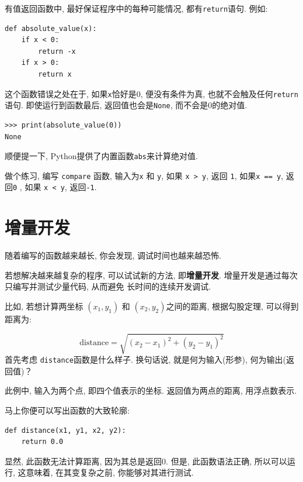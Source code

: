 \documentclass[10pt]{book}
\begin{document}
有值返回函数中, 最好保证程序中的每种可能情况, 都有{\tt return}语句. 例如:

\begin{verbatim}
def absolute_value(x):
    if x < 0:
        return -x
    if x > 0:
        return x
\end{verbatim}
%

这个函数错误之处在于, 如果{\tt x}恰好是0,
便没有条件为真, 也就不会触及任何{\tt return}语句. 
即使运行到函数最后, 返回值也会是{\tt None}, 而不会是0的绝对值. 

\begin{verbatim}
>>> print(absolute_value(0))
None
\end{verbatim}
%
顺便提一下, Python提供了内置函数{\tt abs}来计算绝对值. 

做个练习, 编写 {\tt compare} 函数, 输入为{\tt x} 和 {\tt y}, 
如果 {\tt x > y},  返回 {\tt 1}, 
如果{\tt x == y},  返回{\tt 0} , 
如果 {\tt x < y},  返回{\tt -1}. 


\section{增量开发}
\label{incremental.development}

随着编写的函数越来越长, 你会发现, 调试时间也越来越恐怖. 

若想解决越来越复杂的程序, 可以试试新的方法, 即{\bf 增量开发}.
增量开发是通过每次只编写并测试少量代码, 从而避免
长时间的连续开发调试. 

比如, 若想计算两坐标 $(x_1, y_1)$ 和 $(x_2, y_2)$之间的距离, 
根据勾股定理, 可以得到距离为:

\begin{displaymath}
\mathrm{distance} = \sqrt{(x_2 - x_1)^2 + (y_2 - y_1)^2}
\end{displaymath}
%
首先考虑 {\tt distance}函数是什么样子. 换句话说, 就是何为输入(形参), 
何为输出(返回值)？

此例中, 输入为两个点, 即四个值表示的坐标. 返回值为两点的距离, 用浮点数表示. 

马上你便可以写出函数的大致轮廓:

\begin{verbatim}
def distance(x1, y1, x2, y2):
    return 0.0
\end{verbatim}
%
显然, 此函数无法计算距离, 因为其总是返回0.
但是, 此函数语法正确, 所以可以运行, 
这意味着, 在其变复杂之前, 你能够对其进行测试. 
\end{document}
